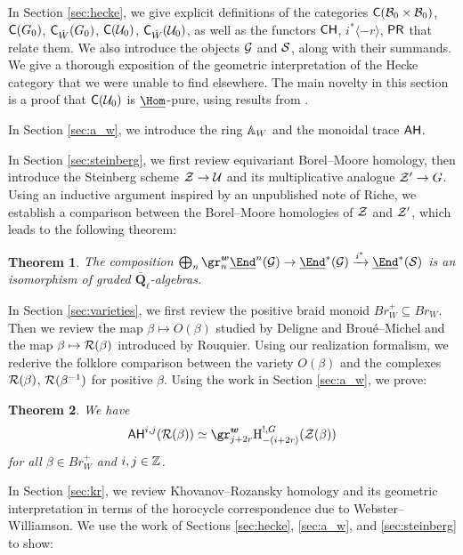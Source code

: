 \documentclass[a4paper,10pt,leqno]{amsart}
\theoremstyle{plain}
\newtheorem{mainthm}{Theorem}
\theoremstyle{plain}
\theoremstyle{plain}
\theoremstyle{definition}
\theoremstyle{remark}
\newcommand{\Br}{\mathit{Br}}
\newcommand{\QL}{\bar{\mathbf{Q}}_\ell}
\begin{document}
In Section \ref{sec:hecke}, we give explicit definitions of the categories $\sf{C}(\cal{B}_0 \times \cal{B}_0)$, $\sf{C}(G_0)$, $\sf{C}_{\hat{W}}(G_0)$, $\sf{C}(\cal{U}_0)$, $\sf{C}_{\hat{W}}(\cal{U}_0)$, as well as the functors $\sf{CH}$, $i^\ast\langle -r\rangle$, $\sf{PR}$ that relate them.
We also introduce the objects $\cal{G}$ and $\cal{S}$, along with their summands.
We give a thorough exposition of the geometric interpretation of the Hecke category that we were unable to find elsewhere.
The main novelty in this section is a proof that $\sf{C}(\cal{U}_0)$ is $\SHom$-pure, using results from \cite{lusztig_1984_intersection, rr}.

In Section \ref{sec:a_w}, we introduce the ring $\bb{A}_W$ and the monoidal trace $\sf{AH}$.

In Section \ref{sec:steinberg}, we first review equivariant Borel--Moore homology, then introduce the Steinberg scheme $\cal{Z} \to \cal{U}$ and its multiplicative analogue $\cal{Z}' \to G$.
Using an inductive argument inspired by an unpublished note of Riche, we establish a comparison between the Borel--Moore homologies of $\cal{Z}$ and $\cal{Z}'$, which leads to the following theorem:

\begin{mainthm}\label{thm:pure-iso}
The composition $\bigoplus_n \gr_n^{\bm{w}} \SEnd^n(\cal{G}) \to \SEnd^\ast(\cal{G}) \xrightarrow{i^\ast} \SEnd^\ast(\cal{S})$ is an isomorphism of graded $\QL$-algebras.
\end{mainthm}

In Section \ref{sec:varieties}, we first review the positive braid monoid $\Br_W^+ \subseteq \Br_W$.
Then we review the map $\beta \mapsto O(\beta)$ studied by Deligne and Brou\'e--Michel and the map $\beta \mapsto \cal{R}(\beta)$ introduced by Rouquier.
Using our realization formalism, we rederive the folklore comparison between the variety $O(\beta)$ and the complexes $\cal{R}(\beta)$, $\cal{R}(\beta^{-1})$ for positive $\beta$.
Using the work in Section \ref{sec:a_w}, we prove:

\begin{mainthm}\label{thm:a_w-to-varieties}
We have
\begin{align}
\sf{AH}^{i, j}(\cal{R}(\beta))
\simeq \gr_{j + 2r}^{\bm{w}} \ur{H}_{-(i + 2r)}^{!, G}(\cal{Z}(\beta))
\end{align}
for all $\beta \in \Br_W^+$ and $i, j \in \bb{Z}$.
\end{mainthm}

In Section \ref{sec:kr}, we review Khovanov--Rozansky homology and its geometric interpretation in terms of the horocycle correspondence due to Webster--Williamson.
We use the work of Sections \ref{sec:hecke}, \ref{sec:a_w}, and \ref{sec:steinberg} to show:
\end{document}
